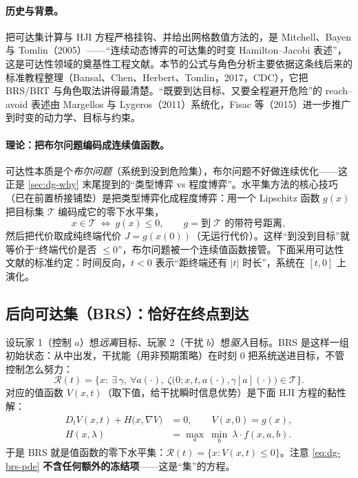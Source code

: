 \paragraph{历史与背景。}
把可达集计算与 HJI 方程严格挂钩、并给出网格数值方法的，是 Mitchell、Bayen 与 Tomlin（2005）——“连续动态博弈的可达集的时变 Hamilton--Jacobi 表述”，这是可达性领域的奠基性工程文献\cite{mitchell2005time}。本节的公式与角色分析主要依据这条线后来的标准教程整理（Bansal、Chen、Herbert、Tomlin，2017，CDC）\cite{bansal2017hamilton}，它把 BRS/BRT 与角色取法讲得最清楚。“既要到达目标、又要全程避开危险”的 reach--avoid 表述由 Margellos 与 Lygeros（2011）系统化\cite{margellos2011hamilton}，Fisac 等（2015）进一步推广到时变的动力学、目标与约束\cite{fisac2015reach}。

\paragraph{理论：把布尔问题编码成连续值函数。}
可达性本质是个\emph{布尔问题}（系统到没到危险集），布尔问题不好做连续优化——这正是 \cref{sec:dg-why} 末尾提到的“类型博弈 vs 程度博弈”。水平集方法的核心技巧（已在前置桥接铺垫）是把类型博弈化成程度博弈：用一个 Lipschitz 函数 $g(x)$ 把目标集 $\mathcal{T}$ 编码成它的零下水平集，
\begin{equation}
  x\in\mathcal{T}\ \Longleftrightarrow\ g(x)\le 0,\qquad g=\text{到 }\mathcal{T}\text{ 的带符号距离},
  \label{eq:dg-sdf}
\end{equation}
然后把代价取成纯终端代价 $J=g(x(0))$（无运行代价）。这样“到没到目标”就等价于“终端代价是否 $\le0$”，布尔问题被一个连续值函数接管。下面采用可达性文献的标准约定：时间反向，$t<0$ 表示“距终端还有 $|t|$ 时长”，系统在 $[t,0]$ 上演化。

\subsection{后向可达集（BRS）：恰好在终点到达}
\label{sec:dg-brs}
设玩家 1（控制 $a$）想\emph{远离}目标、玩家 2（干扰 $b$）想\emph{驱入}目标。BRS 是这样一组初始状态：从中出发，干扰能（用非预期策略）在时刻 $0$ 把系统送进目标，不管控制怎么努力：
\begin{equation}
  \mathcal{R}(t)=\Big\{x:\ \exists\,\gamma,\ \forall a(\cdot),\ \zeta\big(0;x,t,a(\cdot),\gamma[a](\cdot)\big)\in\mathcal{T}\Big\}.
  \label{eq:dg-brs-def}
\end{equation}
对应的值函数 $V(x,t)$（取下值，给干扰瞬时信息优势）是下面 HJI 方程的黏性解：
\begin{align}
  D_t V(x,t)+H\big(x,\nabla V\big)&=0,\qquad V(x,0)=g(x), \label{eq:dg-brs-pde}\\
  H(x,\lambda)&=\max_{a}\ \min_{b}\ \lambda\cdot f(x,a,b). \label{eq:dg-brs-ham}
\end{align}
于是 BRS 就是值函数的零下水平集：$\mathcal{R}(t)=\{x:V(x,t)\le 0\}$。注意 \cref{eq:dg-brs-pde} \textbf{不含任何额外的冻结项}——这是“集”的方程。

